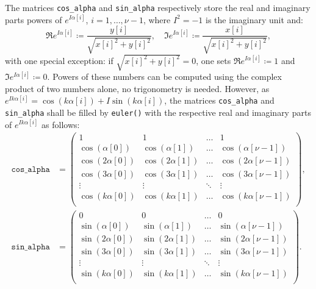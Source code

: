 \documentclass{scrbook}
\begin{document}
The matrices \lstinline|cos_alpha| and \lstinline|sin_alpha| respectively store
the real and imaginary parts powers of $e^{I\alpha[i]}$, $i=1,\dotsc,\nu-1$,
where $I^2=-1$ is the imaginary unit and:
\begin{equation*}
\Re e^{I\alpha[i]} \coloneqq  \frac{y[i]}{\sqrt{x[i]^2+y[i]^2}},\quad
\Im e^{I\alpha[i]} \coloneqq  \frac{x[i]}{\sqrt{x[i]^2+y[i]^2}},
\end{equation*}
with one special exception: if $\sqrt{x[i]^2+y[i]^2}=0$, one sets
$\Re e^{I\alpha[i]} \coloneqq 1$ and $\Im e^{I\alpha[i]} \coloneqq 0.$ Powers
of these numbers can be computed using the complex product of two numbers alone,
no trigonometry is needed. However, as
$e^{Ik\alpha[i]} = \cos(k\alpha[i]) +I\sin(k\alpha[i])$, the matrices
\lstinline|cos_alpha| and \lstinline|sin_alpha| shall be filled by
\lstinline|euler()| with the respective real and imaginary parts of
$e^{Ik\alpha[i]}$ as follows:
\begin{equation*}\label{eqn:sincosmatrix}
\begin{split}
\mathtt{cos\_alpha} &=
\begin{pmatrix}
1                & 1                & \hdots & 1                    \\
\cos(\alpha[0])  & \cos(\alpha[1])  & \hdots & \cos(\alpha[\nu-1])  \\
\cos(2\alpha[0]) & \cos(2\alpha[1]) & \hdots & \cos(2\alpha[\nu-1]) \\
\cos(3\alpha[0]) & \cos(3\alpha[1]) & \hdots & \cos(3\alpha[\nu-1]) \\
\vdots           & \vdots           & \ddots & \vdots               \\
\cos(k\alpha[0]) & \cos(k\alpha[1]) & \hdots & \cos(k\alpha[\nu-1]) \\
\end{pmatrix},
\\[1cm]
\mathtt{sin\_alpha} &=
\begin{pmatrix}
0                & 0                & \hdots & 0                    \\
\sin(\alpha[0])  & \sin(\alpha[1])  & \hdots & \sin(\alpha[\nu-1])  \\
\sin(2\alpha[0]) & \sin(2\alpha[1]) & \hdots & \sin(2\alpha[\nu-1]) \\
\sin(3\alpha[0]) & \sin(3\alpha[1]) & \hdots & \sin(3\alpha[\nu-1]) \\
\vdots           & \vdots           & \ddots & \vdots               \\
\sin(k\alpha[0]) & \sin(k\alpha[1]) & \hdots & \sin(k\alpha[\nu-1]) \\
\end{pmatrix}.
\end{split}
\end{equation*}
\end{document}
